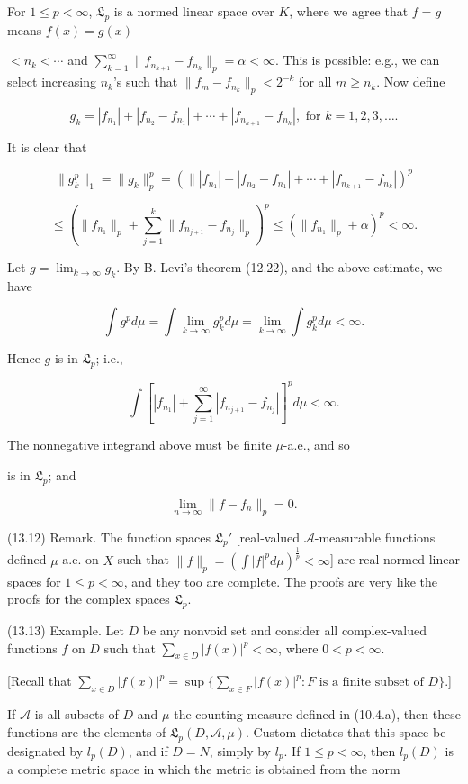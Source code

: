 For $1 \leq p < \infty$, $\mathfrak{L}_p$ is a normed linear space over $K$, where we agree that $f = g$ means $f(x) = g(x)$

$< n_k < \cdots$ and $\sum_{k=1}^{\infty} \| f_{n_{k+1}} - f_{n_k} \|_p = \alpha < \infty$. This is possible: e.g., we can select increasing $n_k$'s such that $\| f_m - f_{n_k} \|_p < 2^{-k}$ for all $m \geq n_k$. Now define

$$g_k = |f_{n_1}| + |f_{n_2} - f_{n_1}| + \cdots + |f_{n_{k+1}} - f_{n_k}|, \text{ for } k = 1, 2, 3, \ldots.$$

It is clear that

$$\| g_k^p \|_1 = \| g_k \|_p^p = \left( \| |f_{n_1}| + |f_{n_2} - f_{n_1}| + \cdots + |f_{n_{k+1}} - f_{n_k}| \right)^p$$

$$\leq \left( \| f_{n_1} \|_p + \sum_{j=1}^{k} \| f_{n_{j+1}} - f_{n_j} \|_p \right)^p \leq \left( \| f_{n_1} \|_p + \alpha \right)^p < \infty.$$

Let $g = \lim_{k \to \infty} g_k$. By B. Levi's theorem (12.22), and the above estimate, we have

$$\int g^p d\mu = \int \lim_{k \to \infty} g_k^p d\mu = \lim_{k \to \infty} \int g_k^p d\mu < \infty.$$

Hence $g$ is in $\mathfrak{L}_p$; i.e.,

$$\int \left[ |f_{n_1}| + \sum_{j=1}^{\infty} |f_{n_{j+1}} - f_{n_j}| \right]^p d\mu < \infty.$$

The nonnegative integrand above must be finite $\mu$-a.e., and so

is in $\mathfrak{L}_p$; and

$$\lim_{n \to \infty} \|f - f_n\|_p = 0.$$ 

(13.12) Remark. The function spaces $\mathfrak{L}_p'$ [real-valued $\mathcal{A}$-measurable functions defined $\mu$-a.e. on $X$ such that $\|f\|_p = (\int |f|^p d\mu)^{\frac{1}{p}} < \infty$] are real normed linear spaces for $1 \leq p < \infty$, and they too are complete. The proofs are very like the proofs for the complex spaces $\mathfrak{L}_p$.

(13.13) Example. Let $D$ be any nonvoid set and consider all complex-valued functions $f$ on $D$ such that $\sum_{x \in D} |f(x)|^p < \infty$, where $0 < p < \infty$.

[Recall that $\sum_{x \in D} |f(x)|^p = \sup \{ \sum_{x \in F} |f(x)|^p : F \text{ is a finite subset of } D \}.$]

If $\mathcal{A}$ is all subsets of $D$ and $\mu$ the counting measure defined in (10.4.a), then these functions are the elements of $\mathfrak{L}_p(D, \mathcal{A}, \mu)$. Custom dictates that this space be designated by $l_p(D)$, and if $D = N$, simply by $l_p$. If $1 \leq p < \infty$, then $l_p(D)$ is a complete metric space in which the metric is obtained from the norm

